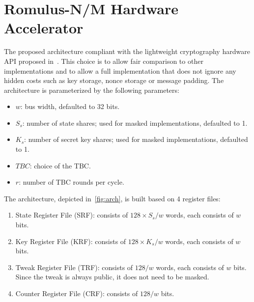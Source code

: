 \documentclass[conference]{IEEEtran}
\begin{document}
\section{Romulus-N/M Hardware Accelerator}

The proposed architecture compliant with the lightweight cryptography hardware API proposed in~\cite{kaps2019hardware}. This choice is to allow fair comparison to other implementations and to allow a full implementation that does not ignore any hidden costs such as key storage, nonce storage or message padding. The architecture is parameterized by the following parameters:
%
\begin{itemize}
\item $w$: bus width, defaulted to 32 bits.
\item $S_s$: number of state shares; used for masked implementations, defaulted to 1.
\item $K_s$: number of secret key shares; used for masked implementations, defaulted to 1.
\item $TBC$: choice of the TBC.
\item $r$: number of TBC rounds per cycle.
\end{itemize}
%
The architecture, depicted in~\ref{fig:arch}, is built based on 4 register files:
%
\begin{enumerate}
\item State Register File (SRF): consists of $128\times S_s/w$ words, each consists of $w$ bits.
\item Key Register File (KRF): consists of $128\times K_s/w$ words, each consists of $w$ bits.
\item Tweak Register File (TRF): consists of $128/w$ words, each consists of $w$ bits. Since the tweak is always public, it does not need to be masked.
\item Counter Register File (CRF): consists of $128/w$ bits.
\end{enumerate}
\end{document}
